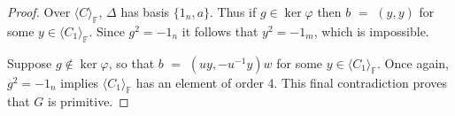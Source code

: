 \documentclass[12pt]{amsart}
\theoremstyle{definition}
\theoremstyle{remark}
\begin{document}
\begin{proof}
 Over $\langle C \rangle_\mathbb{F}$, $\Delta$ has basis
 $\{ 1_n, a\}$.
 Thus if 
% 
 $g \in \ker \varphi$ then $b$ $=$ 
 $(y, y)$ for some
 $y\in \langle C_1\rangle_\mathbb{F}$. Since $g^2 = -1_n$
 it follows that $y^2 = -1_m$,
 which is impossible.

 Suppose $g \notin \ker \varphi$, so that
 $b$ $=$ $(u y ,-u^{-1} y)w$ for some 
 $y \in \langle C_1\rangle_\mathbb{F}$.
 Once again, $g^2 = -1_n$ implies 
 $\langle C_1\rangle_\mathbb{F}$ has an element
 of order 4. This final contradiction proves that $G$ is primitive. 
\end{proof}
\end{document}
